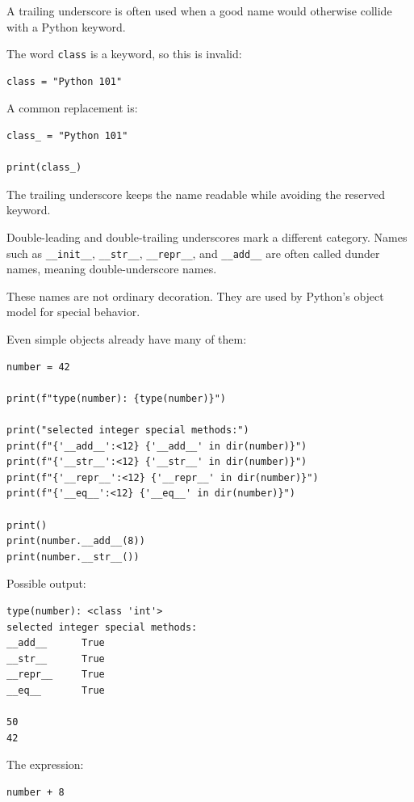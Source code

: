 A trailing underscore is often used when a good name would otherwise collide with a Python keyword.

The word \texttt{class} is a keyword, so this is invalid:

\begin{verbatim}
class = "Python 101"
\end{verbatim}

A common replacement is:

\begin{verbatim}
class_ = "Python 101"

print(class_)
\end{verbatim}

The trailing underscore keeps the name readable while avoiding the reserved keyword.

Double-leading and double-trailing underscores mark a different category. Names such as \texttt{\_\_init\_\_}, \texttt{\_\_str\_\_}, \texttt{\_\_repr\_\_}, and \texttt{\_\_add\_\_} are often called dunder names, meaning double-underscore names.

These names are not ordinary decoration. They are used by Python's object model for special behavior.

Even simple objects already have many of them:

\begin{verbatim}
number = 42

print(f"type(number): {type(number)}")

print("selected integer special methods:")
print(f"{'__add__':<12} {'__add__' in dir(number)}")
print(f"{'__str__':<12} {'__str__' in dir(number)}")
print(f"{'__repr__':<12} {'__repr__' in dir(number)}")
print(f"{'__eq__':<12} {'__eq__' in dir(number)}")

print()
print(number.__add__(8))
print(number.__str__())
\end{verbatim}

Possible output:

\begin{verbatim}
type(number): <class 'int'>
selected integer special methods:
__add__      True
__str__      True
__repr__     True
__eq__       True

50
42
\end{verbatim}

The expression:

\begin{verbatim}
number + 8
\end{verbatim}

